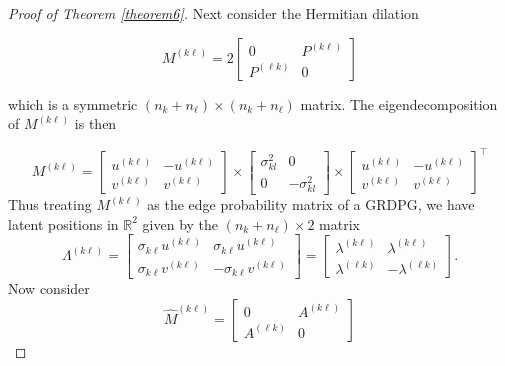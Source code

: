 \documentclass[12pt]{article}
\begin{document}
\begin{proof}[Proof of Theorem \ref{theorem6}]
Next consider the Hermitian dilation

\[M^{(k \ell)} = 2 \begin{bmatrix} 0 & P^{(k \ell)} \\ P^{(\ell k)} & 0 \end{bmatrix}\]

which is a symmetric \((n_k + n_\ell) \times (n_k + n_\ell)\) matrix. The
eigendecomposition of \(M^{(k \ell)}\) is then

\[M^{(k \ell)} = 
\begin{bmatrix} u^{(k \ell)} & -u^{(k \ell)} \\ v^{(k \ell)} & v^{(k \ell)} \end{bmatrix} \times 
\begin{bmatrix} \sigma^2_{kl} & 0 \\ 0 & -\sigma^2_{kl} \end{bmatrix} \times
\begin{bmatrix} u^{(k \ell)} & -u^{(k \ell)} \\ v^{(k \ell)} & v^{(k \ell)} \end{bmatrix}^\top\]
Thus treating \(M^{(k \ell)}\) as the edge probability matrix of a GRDPG, we
have latent positions in \(\mathbb{R}^2\) given by the $(n_k + n_{\ell}) \times 2$ matrix
\[\Lambda^{(k \ell)} = \begin{bmatrix} 
  \sigma_{k \ell} u^{(k \ell)} & \sigma_{k \ell} u^{(k \ell)} \\ 
  \sigma_{k \ell} v^{(k \ell)} & -\sigma_{k \ell} v^{(k \ell)} 
\end{bmatrix} = 
\begin{bmatrix} 
  \lambda^{(k \ell)} & \lambda^{(k \ell)} \\ 
  \lambda^{( \ell k)} & -\lambda^{( \ell k)} 
\end{bmatrix}.\]
Now consider
\[\hat{M}^{(k \ell)} = \begin{bmatrix} 0 & A^{(k \ell)} \\ A^{(\ell k)} & 0 \end{bmatrix}\]



\end{proof}
\end{document}
